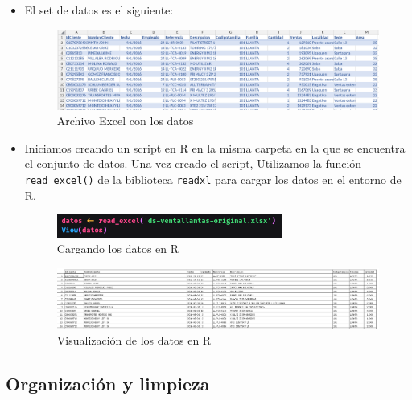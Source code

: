 \documentclass[12pt]{article}
\begin{document}
            \begin{itemize}
                \item El set de datos es el siguiente:
                    \begin{figure}[h]
                        \centering 
                        \includegraphics[width=1\textwidth]{img/limpieza-1.png}
                        \caption{Archivo Excel con los datos}
                \end{figure}

                \item Iniciamos creando un script en R en la misma carpeta en la que se encuentra el conjunto de datos. Una vez creado el script, Utilizamos la función \texttt{read\_excel()} de la biblioteca \texttt{readxl} para cargar los datos en el entorno de R.
                    \begin{figure}[h]
                        \centering 
                        \includegraphics[width=0.7\textwidth]{img/limpieza-2.png}
                        \caption{Cargando los datos en R}
                    \end{figure}

                    \newpage
                    \begin{figure}[h]
                        \centering 
                        \includegraphics[width=1\textwidth]{img/limpieza-3.png}
                        \caption{Visualización de los datos en R}
                    \end{figure}

            \end{itemize}


        \subsection{Organización y limpieza}
\end{document}

